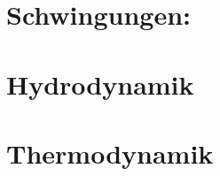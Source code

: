 \documentclass[final, 12pt]{article}
\begin{document}
  



\section{Schwingungen:}


\section{Hydrodynamik}


\section{Thermodynamik}



\newpage
\end{document}
